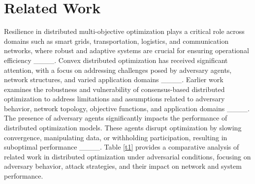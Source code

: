 \section{Related Work}
\label{sec2} 
Resilience in distributed multi-objective optimization plays a critical role across domains such as smart grids, transportation, logistics, and communication networks, where robust and adaptive systems are crucial for ensuring operational efficiency ____. Convex distributed optimization has received significant attention, with a focus on addressing challenges posed by adversary agents, network structures, and varied application domains ____. Earlier work examines the robustness and vulnerability of consensus-based distributed optimization to address limitations and assumptions related to adversary behavior, network topology, objective functions, and application domains ____. The presence of adversary agents significantly impacts the performance of distributed optimization models. These agents disrupt optimization by slowing convergence, manipulating data, or withholding participation, resulting in suboptimal performance ____. Table \ref{t1} provides a comparative analysis of related work in distributed optimization under adversarial conditions, focusing on adversary behavior, attack strategies, and their impact on network and system performance.

